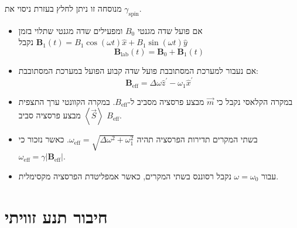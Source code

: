 \documentclass{tstextbook}
\begin{document}
\begin{remark}
מנוסחה זו ניתן לחלץ בעזרת ניסוי את \(\gamma_{\text{spin}}\).

\end{remark}
\begin{summary}
  \begin{itemize}
    \item אם פועל שדה מגנטי \(B_{0}\) ומפעילים שדה מגנטי שתלוי בזמן \(\mathbf{B}_{1}(t)=B_{1}\cos(\omega t){\hat{x}}+B_{1}\sin(\omega t){\hat{y}}\) נקבל
$$\mathbf{B}_{\mathrm{lab}}(t)=\mathbf{B}_{0}+\mathbf{B}_{1}(t)$$
    \item אם נעבור למערכת המסתובבת פועל שדה קבוע הפועל במערכת המסתובבת:
$$\mathbf{B}_{\mathrm{eff}}=\Delta\omega\hat{z}^{\prime}-\omega_{1}\hat{x}^{\prime}$$
    \item במקרה הקלאסי נקבל כי \(\vec{m}\) מבצע פרסציה מסביב ל-\(B_{\text{eff}}\). במקרה הקוונטי ערך התצפית \(\left\langle  \vec{S}  \right\rangle\) מבצע פרסציה סביב \(B_{\mathrm{eff}}\).
    \item בשתי המקרים תדירות הפרסציה תהיה \(\omega_{\mathrm{eff}}=\sqrt{ \Delta \omega^{2}+\omega_{1}^{2} }\). כאשר נזכור כי \(\omega_{\mathrm{eff}}=\gamma|\mathbf{B}_{\mathrm{eff}}|\).
    \item עבור \(\omega=\omega_{0}\) נקבל רסוננס בשתי המקרים, כאשר אמפליטדת הפרסציה מקסימלית.
  \end{itemize}
\end{summary}

\section{חיבור תנע זוויתי}
\end{document}
